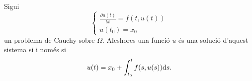 \documentclass[../Apunts.tex]{subfiles}
\begin{document}
	\begin{observation}
		\label{obs:solució general d'un problema de Cauchy}
		Sigui
		\[\begin{cases*}
			\displaystyle \frac{\partial u(t)}{\partial t}=f(t,u(t)) \\
			\displaystyle u(t_{0})=x_{0}
		\end{cases*}\]
		un problema de Cauchy sobre \(\Omega\). Aleshores una funció \(u\) és una solució d'aquest sistema si i només si
		\[u(t)=x_{0}+\int_{t_{0}}^{t}f(s,u(s))\mathrm{d} s.\]
	\end{observation}
\end{document}

